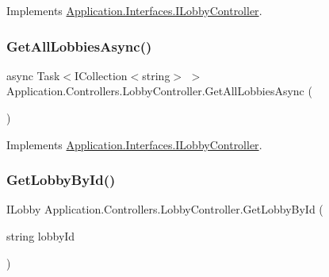 Implements \mbox{\hyperlink{interface_application_1_1_interfaces_1_1_i_lobby_controller_a2e1d8f72361ee48e956fb473ceabadf4}{Application.\+Interfaces.\+I\+Lobby\+Controller}}.

\mbox{\label{class_application_1_1_controllers_1_1_lobby_controller_a881adadc726a5daa68fe702439723630}} 
\subsubsection{\texorpdfstring{Get\+All\+Lobbies\+Async()}{GetAllLobbiesAsync()}}
{\footnotesize\ttfamily async Task$<$I\+Collection$<$string$>$ $>$ Application.\+Controllers.\+Lobby\+Controller.\+Get\+All\+Lobbies\+Async (\begin{DoxyParamCaption}{ }\end{DoxyParamCaption})}



Implements \mbox{\hyperlink{interface_application_1_1_interfaces_1_1_i_lobby_controller_acf938121367844d623fa4127cf643e50}{Application.\+Interfaces.\+I\+Lobby\+Controller}}.

\mbox{\label{class_application_1_1_controllers_1_1_lobby_controller_a5ea797c6456dc8d40e16b87077a16693}} 
\subsubsection{\texorpdfstring{Get\+Lobby\+By\+Id()}{GetLobbyById()}}
{\footnotesize\ttfamily I\+Lobby Application.\+Controllers.\+Lobby\+Controller.\+Get\+Lobby\+By\+Id (\begin{DoxyParamCaption}\item[{string}]{lobby\+Id }\end{DoxyParamCaption})}



